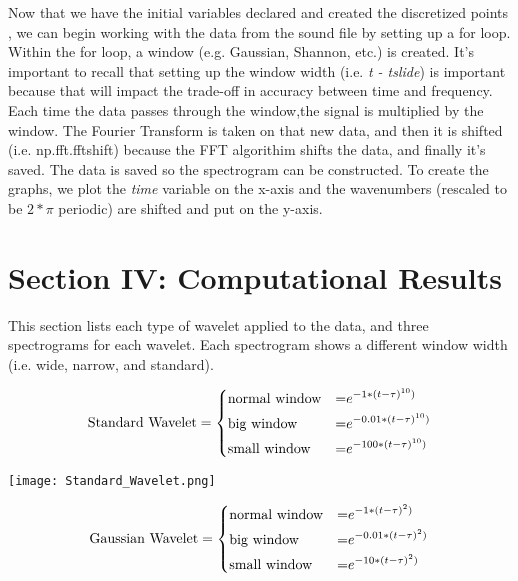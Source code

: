 \documentclass{cup-pan}
\begin{document}
\vskip 0.1in
\noindent
Now that we have the initial variables declared and created the discretized points , we can begin working with the data from the sound file by setting up a for loop.  Within the for loop, a window (e.g. Gaussian, Shannon, etc.) is created. It's important to recall that setting up the window width (i.e. \textit{t - tslide}) is important because that will impact the trade-off in accuracy between time and frequency.  Each time the data passes through the window,the signal is multiplied by the window. The Fourier Transform is taken on that new data, and then it is shifted (i.e. np.fft.fftshift) because the FFT algorithim shifts the data, and finally it's saved.  The data is saved so the spectrogram can be constructed.   To create the graphs, we plot the \textit{time} variable on the x-axis and the wavenumbers (rescaled to be $2 * \pi$ periodic) are shifted and put on the y-axis.


\section{Section IV: Computational Results}
This section lists each type of wavelet applied to the data, and three spectrograms for each wavelet.  Each spectrogram shows a different window width (i.e. wide, narrow, and standard).

\pagebreak

$$\text{Standard Wavelet}=\begin{equation}
\left\{
  \begin{aligned}
    &\text{normal window} &= \space &e^{-1*(t-\tau)^{10})} \\
    &\text{big window} &= \space &e^{-0.01*(t-\tau)^{10})} \\
    &\text{small window} &= \space &e^{-100*(t-\tau)^{10})} \\
  \end{aligned}
  \right.
\end{equation}
$$

\begin{center}
\texttt{[image: Standard\_Wavelet.png]}
\end{center}

\vskip 1.0in

$$\text{Gaussian Wavelet}=\begin{equation}
\left\{
  \begin{aligned}
    &\text{normal window} &= \space &e^{-1*(t-\tau)^{2})} \\
    &\text{big window} &= \space &e^{-0.01*(t-\tau)^{2})} \\
    &\text{small window} &=\space &e^{-10*(t-\tau)^{2})} \\
  \end{aligned}
  \right.
\end{equation}
$$
\end{document}
